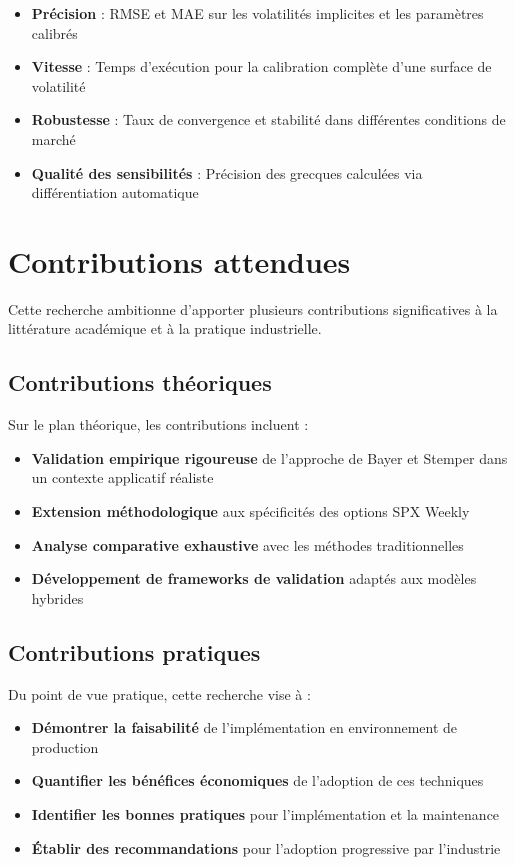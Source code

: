 \begin{itemize}
\item \textbf{Précision} : RMSE et MAE sur les volatilités implicites et les paramètres calibrés
\item \textbf{Vitesse} : Temps d'exécution pour la calibration complète d'une surface de volatilité
\item \textbf{Robustesse} : Taux de convergence et stabilité dans différentes conditions de marché
\item \textbf{Qualité des sensibilités} : Précision des grecques calculées via différentiation automatique
\end{itemize}

\section{Contributions attendues}

Cette recherche ambitionne d'apporter plusieurs contributions significatives à la littérature académique et à la pratique industrielle.

\subsection{Contributions théoriques}

Sur le plan théorique, les contributions incluent :

\begin{itemize}
\item \textbf{Validation empirique rigoureuse} de l'approche de Bayer et Stemper dans un contexte applicatif réaliste
\item \textbf{Extension méthodologique} aux spécificités des options SPX Weekly
\item \textbf{Analyse comparative exhaustive} avec les méthodes traditionnelles
\item \textbf{Développement de frameworks de validation} adaptés aux modèles hybrides
\end{itemize}

\subsection{Contributions pratiques}

Du point de vue pratique, cette recherche vise à :

\begin{itemize}
\item \textbf{Démontrer la faisabilité} de l'implémentation en environnement de production
\item \textbf{Quantifier les bénéfices économiques} de l'adoption de ces techniques
\item \textbf{Identifier les bonnes pratiques} pour l'implémentation et la maintenance
\item \textbf{Établir des recommandations} pour l'adoption progressive par l'industrie
\end{itemize}

